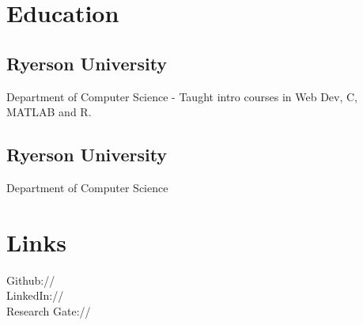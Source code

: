 \documentclass[]{deedy-resume-openfont}
\begin{document}
%
%
\lastupdated

%
%



%
%

\begin{minipage}[t]{0.33\textwidth} 


\section{Education} 

\subsection{Ryerson University}
Department of Computer Science
\bigbreak
- Taught intro courses in Web Dev, C, MATLAB and R. 
\sectionsep

\subsection{Ryerson University}
Department of Computer Science \\
\sectionsep

\section{Links} 
\textbullet{} Github://  \href{https://github.com/FadiSYounis}{} \\
\textbullet{} LinkedIn://  \href{https://ca.linkedin.com/in/fadiyounis}{} \\
\textbullet{} Research Gate://\href{https://www.researchgate.net/profile/Fadi_Younis3}{} \\
\sectionsep


\end{minipage}
\end{document}
